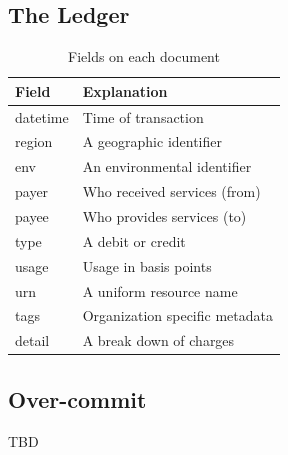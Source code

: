 \documentclass[10pt, a4paper, twocolumn]{article}
\begin{document}
  \subsection*{The Ledger}

    \begin{table}[H]
      \centering
      \begin{tabular}{ l|l }
        Field & Explanation \\
        \hline
        datetime & Time of transaction \\
        region & A geographic identifier \\
        env & An environmental identifier \\
        payer & Who received services (from) \\
        payee & Who provides services (to) \\
        type & A debit or credit \\
        usage & Usage in basis points \\
        urn & A uniform resource name \\
        tags & Organization specific metadata \\
        detail & A break down of charges
      \end{tabular}
      \caption{Fields on each document}
      \label{table:1}
    \end{table}


  \subsection*{Over-commit}

    TBD
\end{document}
